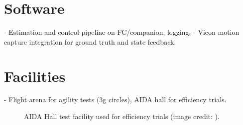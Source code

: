 \section{Software}
- Estimation and control pipeline on FC/companion; logging.
- Vicon motion capture integration for ground truth and state feedback.

\section{Facilities}
- Flight arena for agility tests (3g circles), AIDA hall for efficiency trials.

\begin{figure}[htbp]
	\centering
		\caption[AIDA Hall test facility]{AIDA Hall test facility used for efficiency trials (image credit: \textcite{AIDAHallPhoto2024}).}
	\label{fig:aida-hall}
\end{figure}

